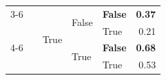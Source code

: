 \begin{tabular}{@{}lllllr@{}}
    \cmidrule{3-6}              
                                                                        &                                 & \multirow[c]{4}{*}{True}  & \multirow[c]{2}{*}{False} & \textbf{False}        & \textbf{0.37} \\
                                                                        &                                 &                           &                           & True                  & 0.21 \\
    \cmidrule{4-6}              
                                                                        &                                 &                           & \multirow[c]{2}{*}{True}  & \textbf{False}        & \textbf{0.68} \\
                                                                        &                                 &                           &                           & True                  & 0.53 \\
    \bottomrule
\end{tabular}

